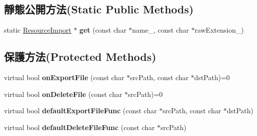 \subsection*{靜態公開方法(Static Public Methods)}
\begin{DoxyCompactItemize}
\item 
static \hyperlink{class_magnum_1_1_resource_import}{Resource\+Import} $\ast$ {\bfseries get} (const char $\ast$name\+\_\+, const char $\ast$raw\+Extension\+\_\+)\hypertarget{class_magnum_1_1_resource_import_a2e584faa0f78755d83ab9f1f65e6c543}{}\label{class_magnum_1_1_resource_import_a2e584faa0f78755d83ab9f1f65e6c543}

\end{DoxyCompactItemize}
\subsection*{保護方法(Protected Methods)}
\begin{DoxyCompactItemize}
\item 
virtual bool {\bfseries on\+Export\+File} (const char $\ast$src\+Path, const char $\ast$dst\+Path)=0\hypertarget{class_magnum_1_1_resource_import_a530307ed425ca79d7930faaefb004bb3}{}\label{class_magnum_1_1_resource_import_a530307ed425ca79d7930faaefb004bb3}

\item 
virtual bool {\bfseries on\+Delete\+File} (const char $\ast$src\+Path)=0\hypertarget{class_magnum_1_1_resource_import_a3ff6887d54532ac60c38cd6bb0837fa3}{}\label{class_magnum_1_1_resource_import_a3ff6887d54532ac60c38cd6bb0837fa3}

\item 
virtual bool {\bfseries default\+Export\+File\+Func} (const char $\ast$src\+Path, const char $\ast$dst\+Path)\hypertarget{class_magnum_1_1_resource_import_a879ff7033f90c4f0419c1b2017a8cf9f}{}\label{class_magnum_1_1_resource_import_a879ff7033f90c4f0419c1b2017a8cf9f}

\item 
virtual bool {\bfseries default\+Delete\+File\+Func} (const char $\ast$src\+Path)\hypertarget{class_magnum_1_1_resource_import_a17fd6a2ca7362558ad962ec91d31b0dd}{}\label{class_magnum_1_1_resource_import_a17fd6a2ca7362558ad962ec91d31b0dd}

\end{DoxyCompactItemize}
